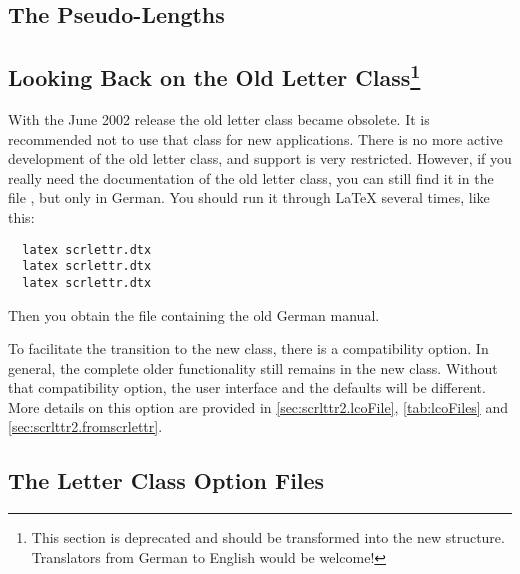 \subsection{The Pseudo-Lengths}



\subsection{Looking Back on the Old Letter Class\protect\footnote{This section is
  deprecated and should be transformed into the new structure. Translators
  from German to English would be welcome!}}
\label{sec:scrlttr2-deprecated.scrlettr}

With the June 2002 release the old letter class
 became obsolete. It is
recommended not to use that class for new applications. There is no
more active development of the old letter class, and support is very
restricted. However, if you really need the documentation of the old
letter class, you can still find it in the file ,
but only in German. You should run it through {\LaTeX} several times,
like this:
\begin{lstlisting}
  latex scrlettr.dtx
  latex scrlettr.dtx
  latex scrlettr.dtx
\end{lstlisting}
Then you obtain the file  containing the old German
manual.

To facilitate the transition to the new class, there is a
compatibility option. In general, the complete older functionality
still remains in the new class.  Without that compatibility option,
the user interface and the defaults will be different. More details on
this option are provided in \autoref{sec:scrlttr2.lcoFile},
\autoref{tab:lcoFiles} and \autoref{sec:scrlttr2.fromscrlettr}.


\subsection{The Letter Class Option Files}
\label{sec:scrlttr2-experts.lcoFile}

